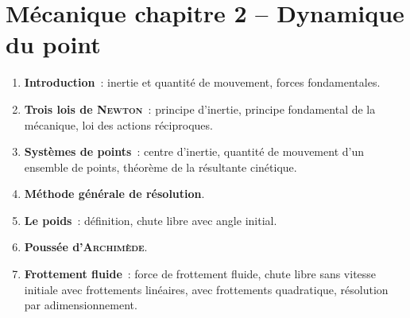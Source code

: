 \documentclass[a4paper, 10pt, final, garamond]{book}
\begin{document}
\section*{Mécanique chapitre 2 -- Dynamique du point}
\begin{enumerate}[label=\Roman*]
    \item \textbf{Introduction}~: inertie et quantité de mouvement, forces
        fondamentales.
    \item \textbf{Trois lois de \textsc{Newton}}~: principe d'inertie, principe
        fondamental de la mécanique, loi des actions réciproques.
    \item \textbf{Systèmes de points}~: centre d'inertie, quantité de mouvement
        d'un ensemble de points, théorème de la résultante cinétique.
    \item \textbf{Méthode générale de résolution}.
    \item \textbf{Le poids}~: définition, chute libre avec angle initial.
    \item \textbf{Poussée d'\textsc{Archimède}}.
    \item \textbf{Frottement fluide}~: force de frottement fluide, chute libre
        sans vitesse initiale avec frottements linéaires, avec frottements
        quadratique, résolution par adimensionnement.
\end{enumerate}
\end{document}
